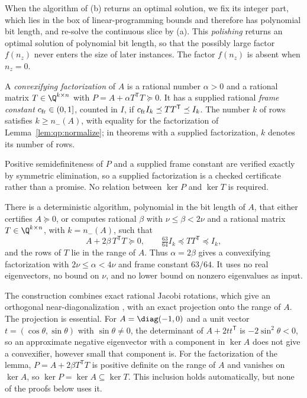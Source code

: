 When the algorithm of (b) returns an optimal solution, we fix its integer
part, which lies in the box of linear-programming bounds and therefore has
polynomial bit length, and re-solve the continuous slice by (a). This
\emph{polishing} returns an optimal solution of polynomial bit length, so
that the possibly large factor $f(n_z)$ never enters the size of later
instances. The factor $f(n_z)$ is absent when $n_z=0$.

\begin{definition}\label{def:qp:factor}
A \emph{convexifying factorization} of $A$ is a rational number $\alpha>0$
and a rational matrix $T\in\Q^{k\times n}$ with $P=A+\alpha T^{\mathsf T} T\succeq0$.
It has a supplied rational \emph{frame constant} $c_{\rm fr}\in(0,1]$, counted
in $I$, if
$c_{\rm fr}I_k\preceq TT^{\mathsf T}\preceq I_k$. The number $k$ of rows satisfies
$k\ge n_-(A)$, with equality for the factorization of
Lemma~\ref{lem:qp:normalize}; in theorems with a supplied factorization, $k$
denotes its number of rows.
\end{definition}

Positive semidefiniteness of $P$ and a supplied frame constant are verified
exactly by symmetric elimination, so a supplied factorization is a checked
certificate rather than a promise. No relation between $\ker P$ and $\ker T$
is required.

\begin{lemma}\label{lem:qp:normalize}
There is a deterministic algorithm, polynomial in the bit length of $A$, that
either certifies $A\succeq0$, or computes rational $\beta$ with
$\nu\le\beta<2\nu$ and a rational matrix $T\in\Q^{k\times n}$, with
$k=n_-(A)$, such that
\[
 A+2\beta\,T^{\mathsf T} T\succeq0,
 \qquad
 \tfrac{63}{64}I_k\preceq TT^{\mathsf T}\preceq I_k,
\]
and the rows of $T$ lie in the range of $A$. Thus $\alpha=2\beta$ gives a
convexifying factorization with $2\nu\le\alpha<4\nu$ and frame constant
$63/64$. It uses no real eigenvectors, no bound on $\nu$, and no lower bound
on nonzero eigenvalues as input.
\end{lemma}

The construction combines exact rational Jacobi rotations, which give an
orthogonal near-diagonalization \cite{pia2026-rational-jacobi-rotations-and-the},
with an exact projection onto the range of $A$. The projection is essential.
For $A=\diag(-1,0)$ and a unit vector $t=(\cos\theta,\sin\theta)$ with
$\sin\theta\ne0$, the determinant of $A+2tt^{\mathsf T}$ is $-2\sin^2\theta<0$, so an
approximate negative eigenvector with a component in $\ker A$ does not give a
convexifier, however small that component is. For the factorization of the lemma,
$P=A+2\beta T^{\mathsf T}T$ is positive definite on the range of $A$ and
vanishes on $\ker A$, so $\ker P=\ker A\subseteq\ker T$. This inclusion
holds automatically, but none of the proofs below uses it.

